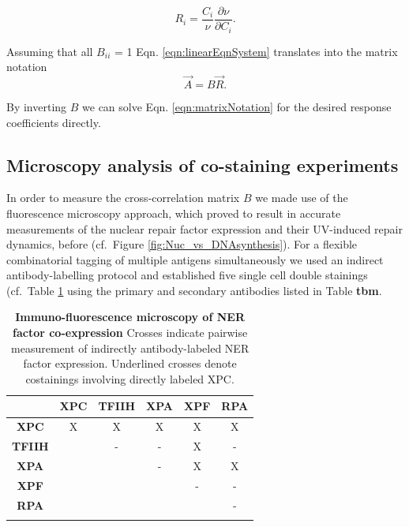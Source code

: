 \begin{equation}
R_i = \frac{C_i}{\nu}\frac{\partial \nu}{\partial C_i}.
\label{eqn:responseCoefficientsII}
\end{equation}

Assuming that all $B_{ii}$ = 1 Eqn. \ref{eqn:linearEqnSystem} translates into the matrix notation 
\begin{equation}
\vec{A} = B\vec{R}.
\label{eqn:matrixNotation}
\end{equation}

By inverting $B$ we can solve Eqn. \ref{eqn:matrixNotation} for the desired response coefficients directly. 


\subsection{Microscopy analysis of co-staining experiments}

In order to measure the cross-correlation matrix $B$ we made use of the fluorescence microscopy approach, which proved to result in accurate measurements of the nuclear repair factor expression and their UV-induced repair dynamics, before (cf.\ Figure \ref{fig:Nuc_vs_DNAsynthesis}). For a flexible combinatorial tagging of multiple antigens simultaneously we used an indirect antibody-labelling protocol and established five single cell double stainings (cf.\ Table \ref{tab:co-staining} using the primary and secondary antibodies listed in Table \textbf{tbm}. 


\begin{table}[h!]
	\centering
	\begin{tabular}{cccccc}
		\hline
			\rule{0pt}{2ex}
			&\textbf{XPC} & \textbf{TFIIH} & \textbf{XPA} & \textbf{XPF} & \textbf{RPA}\\ \hline
			\rule{0pt}{3ex}
\textbf{XPC}&        X    &           X    & X            &         X    & X            \\ \hline
			\rule{0pt}{3ex}
\textbf{TFIIH}&           & -              & -            & X            & -             \\ \hline
			\rule{0pt}{3ex}
\textbf{XPA}&             &                & -            & X            & X             \\ \hline
			\rule{0pt}{3ex}
\textbf{XPF}&             &                &              & -            & -              \\ \hline
			\rule{0pt}{3ex}
\textbf{RPA}&             &                &              &              & -               \\ \hline
			\rule{0pt}{3ex}
		
	\end{tabular}
	\caption{\textbf{Immuno-fluorescence microscopy of NER factor co-expression} Crosses indicate pairwise measurement of indirectly antibody-labeled NER factor expression. Underlined crosses denote costainings involving directly labeled XPC. }\label{tab:co-staining}
\end{table}   



